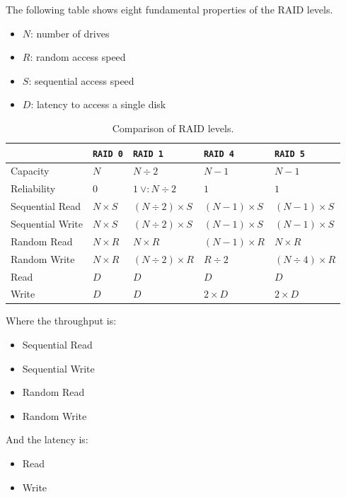 \noindent
The following table shows eight fundamental properties of the RAID levels.
\begin{itemize}
    \item $N$: number of drives
    \item $R$: random access speed
    \item $S$: sequential access speed
    \item $D$: latency to access a single disk
\end{itemize}
\begin{table}[!htp]
    \centering
    \begin{tabular}{@{} l l l l l @{}}
        \toprule
        & \texttt{RAID 0} & \texttt{RAID 1} & \texttt{RAID 4} & \texttt{RAID 5} \\
        \midrule
        Capacity & $N$ & $N \div 2$ & $N - 1$ & $N - 1$ \\
        Reliability & $0$ & $1 \: \lor : N \div 2$ & $1$ & $1$ \\
        \cmidrule{1-5}
        Sequential Read & $N \times S$ & $\left(N \div 2\right) \times S$ & $\left(N - 1\right) \times S$ & $\left(N - 1\right) \times S$ \\
        Sequential Write & $N \times S$ & $\left(N \div 2\right) \times S$ & $\left(N - 1\right) \times S$ & $\left(N - 1\right) \times S$ \\
        Random Read & $N \times R$ & $N \times R$ & $\left(N - 1\right) \times R$ & $N \times R$ \\
        Random Write & $N \times R$ & $\left(N \div 2\right) \times R$ & $R \div 2$ & $\left(N \div 4\right) \times R$ \\
        \cmidrule{1-5}
        Read & $D$ & $D$ & $D$ & $D$ \\
        Write & $D$ & $D$ & $2 \times D$ & $2 \times D$ \\
        \bottomrule
    \end{tabular}
    \caption{Comparison of RAID levels.}
\end{table}

\noindent
Where the throughput is:
\begin{itemize}
    \item Sequential Read
    \item Sequential Write
    \item Random Read
    \item Random Write
\end{itemize}
And the latency is:
\begin{itemize}
    \item Read
    \item Write
\end{itemize}

